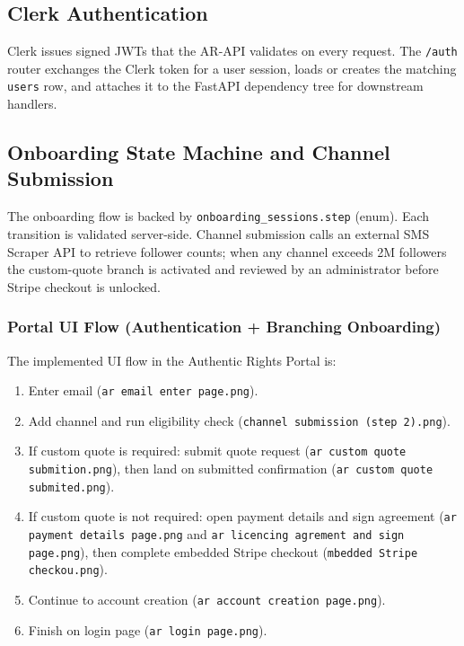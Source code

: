 \subsection{Clerk Authentication}

Clerk issues signed JWTs that the AR-API validates on every request. The \texttt{/auth} router
exchanges the Clerk token for a user session, loads or creates the matching \texttt{users} row,
and attaches it to the FastAPI dependency tree for downstream handlers.

\subsection{Onboarding State Machine and Channel Submission}

The onboarding flow is backed by \texttt{onboarding\_sessions.step} (enum). Each transition is
validated server-side. Channel submission calls an external SMS Scraper API to retrieve follower
counts; when any channel exceeds 2M followers the custom-quote branch is activated and reviewed
by an administrator before Stripe checkout is unlocked.

\subsubsection{Portal UI Flow (Authentication + Branching Onboarding)}

The implemented UI flow in the Authentic Rights Portal is:
\begin{enumerate}[label=\textbf{Step \arabic*:}, leftmargin=2.8cm]
  \item Enter email (\texttt{ar email enter page.png}).
  \item Add channel and run eligibility check (\texttt{channel submission (step 2).png}).
  \item If custom quote is required: submit quote request (\texttt{ar custom quote submition.png}),
        then land on submitted confirmation (\texttt{ar custom quote submited.png}).
  \item If custom quote is not required: open payment details and sign agreement
        (\texttt{ar payment details page.png} and \texttt{ar licencing agrement and sign page.png}),
        then complete embedded Stripe checkout (\texttt{mbedded Stripe checkou.png}).
  \item Continue to account creation (\texttt{ar account creation page.png}).
  \item Finish on login page (\texttt{ar login page.png}).
\end{enumerate}

